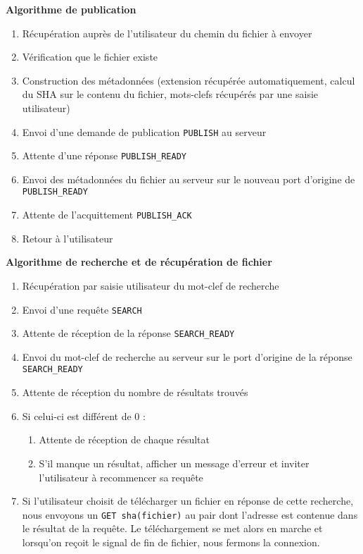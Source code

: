 \noindent \textbf{Algorithme de publication}

\begin{enumerate}
	\item Récupération auprès de l'utilisateur du chemin du fichier à envoyer
	\item Vérification que le fichier existe
	\item Construction des métadonnées (extension récupérée automatiquement, calcul du SHA sur le contenu du fichier, mots-clefs récupérés par une saisie utilisateur)
	\item Envoi d'une demande de publication \texttt{PUBLISH} au serveur
	\item Attente d'une réponse \texttt{PUBLISH\_READY}
	\item Envoi des métadonnées du fichier au serveur sur le nouveau port d'origine de \texttt{PUBLISH\_READY}
	\item Attente de l'acquittement \texttt{PUBLISH\_ACK}
	\item Retour à l'utilisateur
\end{enumerate}

\noindent \textbf{Algorithme de recherche et de récupération de fichier}

\begin{enumerate}
	\item Récupération par saisie utilisateur du mot-clef de recherche
	\item Envoi d'une requête \texttt{SEARCH}
	\item Attente de réception de la réponse \texttt{SEARCH\_READY}
	\item Envoi du mot-clef de recherche au serveur sur le port d'origine de la réponse \texttt{SEARCH\_READY}
	\item Attente de réception du nombre de résultats trouvés
	\item Si celui-ci est différent de 0 :
		\begin{enumerate}
			\item Attente de réception de chaque résultat
			\item S'il manque un résultat, afficher un message d'erreur et inviter l'utilisateur à recommencer sa requête
		\end{enumerate}
	\item Si l'utilisateur choisit de télécharger un fichier en réponse de cette recherche, nous envoyons un \texttt{GET sha(fichier)} au pair dont l'adresse 
	est contenue dans le résultat de la requête. Le téléchargement se met alors en marche et lorsqu'on reçoit le signal de fin de fichier, nous fermons 
	la connexion.
\end{enumerate}
